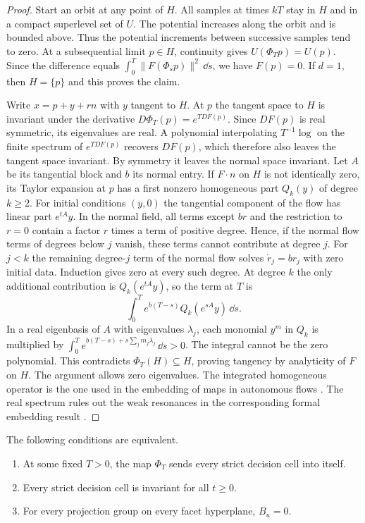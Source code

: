 \begin{proof}
Start an orbit at any point of $H$. All samples at times $kT$ stay
in $H$ and in a compact superlevel set of $U$. The potential increases along the
orbit and is bounded above. Thus the potential increments between
successive samples tend to zero. At a subsequential limit $p\in H$,
continuity gives $U(\Phi_T p)=U(p)$. Since the difference equals
$\int_0^T\lVert F(\Phi_s p)\rVert^2\,\dd s$, we have $F(p)=0$.
If $d=1$, then $H=\{p\}$ and this proves the claim.

Write $x=p+y+rn$ with $y$ tangent to $H$. At $p$ the tangent space to
$H$ is invariant under the derivative $D\Phi_T(p)=e^{TDF(p)}$.
Since $DF(p)$ is real symmetric, its eigenvalues are real. A polynomial
interpolating $T^{-1}\log$ on the finite spectrum of $e^{TDF(p)}$
recovers $DF(p)$, which therefore also leaves the tangent space invariant.
By symmetry it leaves the normal space invariant.
Let $A$ be its tangential block and $b$ its normal entry. If $F\cdot n$
on $H$ is not identically zero, its Taylor expansion at $p$ has a
first nonzero homogeneous part $Q_k(y)$ of degree $k\ge2$. For initial
conditions $(y,0)$ the tangential component of the flow has linear
part $e^{tA}y$. In the normal field, all terms except $br$ and the
restriction to $r=0$ contain a factor $r$ times a term of positive
degree. Hence, if the normal flow terms of degrees below $j$ vanish,
these terms cannot contribute at degree $j$. For $j<k$ the remaining
degree-$j$ term of the normal flow solves $\dot r_j=br_j$ with zero
initial data. Induction gives zero at every such degree. At degree $k$
the only additional contribution is $Q_k(e^{tA}y)$, so the term at $T$ is
\[
 \int_0^T e^{b(T-s)}Q_k(e^{sA}y)\,\dd s.
\]
In a real eigenbasis of $A$ with eigenvalues $\lambda_j$, each monomial
$y^m$ in $Q_k$ is multiplied by
$\int_0^T e^{b(T-s)+s\sum_jm_j\lambda_j}\,\dd s>0$.
The integral cannot be the zero polynomial. This contradicts
$\Phi_T(H)\subseteq H$, proving tangency by analyticity of $F$ on $H$.
The argument allows zero eigenvalues. The integrated homogeneous
operator is the one used in the embedding of maps in autonomous
flows \cite[Eq.~(2.13)]{zhang}. The real spectrum rules out the weak
resonances in the corresponding formal embedding result \cite{ribon}.
\end{proof}

\begin{theorem}
\label{thm:flat}
The following conditions are equivalent.
\begin{enumerate}
\item At some fixed $T>0$, the map $\Phi_T$ sends every strict decision
cell into itself.
\item Every strict decision cell is invariant for all $t\ge0$.
\item For every projection group on every facet hyperplane, $B_u=0$.
\end{enumerate}
\end{theorem}


